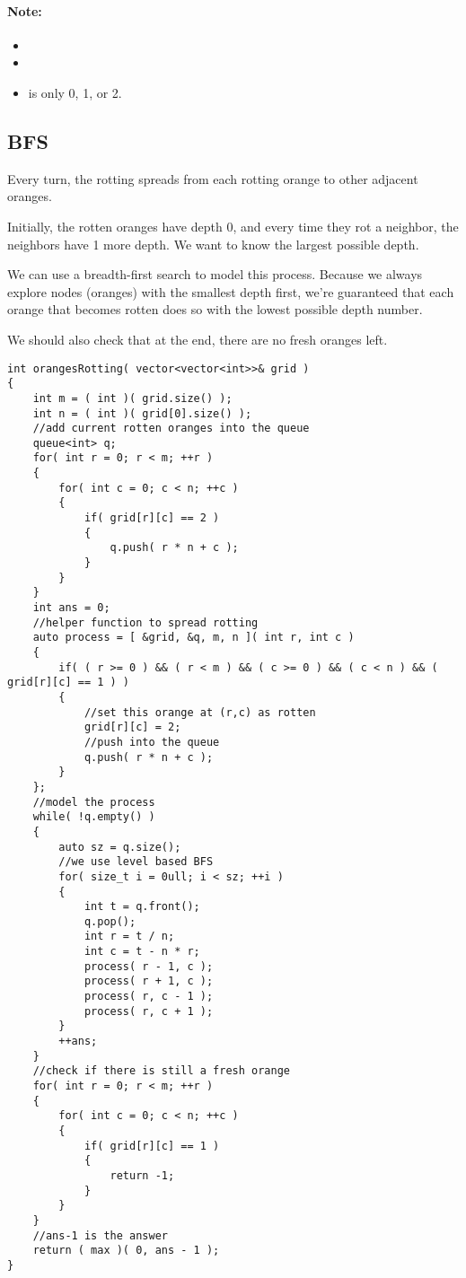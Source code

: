 \paragraph{Note:}

\begin{itemize}
\item {}
\item {}
\item {} is only 0, 1, or 2.
\end{itemize}

\subsection{BFS}
Every turn, the rotting spreads from each rotting orange to other adjacent oranges. 

Initially, the rotten oranges have depth 0, and every time they rot a neighbor, the neighbors have 1 more depth. We want to know the largest possible depth.

We can use a breadth-first search to model this process. Because we always explore nodes (oranges) with the smallest depth first, we're guaranteed that each orange that becomes rotten does so with the lowest possible depth number.

We should also check that at the end, there are no fresh oranges left.

\setcounter{lstlisting}{0}
\begin{lstlisting}[style=customc, caption={BFS}]
int orangesRotting( vector<vector<int>>& grid )
{
    int m = ( int )( grid.size() );
    int n = ( int )( grid[0].size() );
    //add current rotten oranges into the queue
    queue<int> q;
    for( int r = 0; r < m; ++r )
    {
        for( int c = 0; c < n; ++c )
        {
            if( grid[r][c] == 2 )
            {
                q.push( r * n + c );
            }
        }
    }
    int ans = 0;
    //helper function to spread rotting
    auto process = [ &grid, &q, m, n ]( int r, int c )
    {
        if( ( r >= 0 ) && ( r < m ) && ( c >= 0 ) && ( c < n ) && ( grid[r][c] == 1 ) )
        {
            //set this orange at (r,c) as rotten
            grid[r][c] = 2;
            //push into the queue
            q.push( r * n + c );
        }
    };
    //model the process
    while( !q.empty() )
    {
        auto sz = q.size();
        //we use level based BFS
        for( size_t i = 0ull; i < sz; ++i )
        {
            int t = q.front();
            q.pop();
            int r = t / n;
            int c = t - n * r;
            process( r - 1, c );
            process( r + 1, c );
            process( r, c - 1 );
            process( r, c + 1 );
        }
        ++ans;
    }
    //check if there is still a fresh orange
    for( int r = 0; r < m; ++r )
    {
        for( int c = 0; c < n; ++c )
        {
            if( grid[r][c] == 1 )
            {
                return -1;
            }
        }
    }
    //ans-1 is the answer
    return ( max )( 0, ans - 1 );
}
\end{lstlisting}